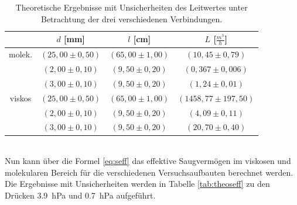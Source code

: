\documentclass[a4paper,usenatbib]{aspdoc}
\begin{document}
            \begin{table}
                \begin{tabular}{c|c|c|c}
                    \multicolumn{1}{c}{} & \multicolumn{1}{c}{$d$ [mm]} & \multicolumn{1}{c}{$l$ [cm]} & \multicolumn{1}{c}{$L$ [$\frac{m^3}{h}$]}\\
                    \cmidrule(lr){2-2}\cmidrule(lr){3-3}\cmidrule(lr){4-4}
                    \toprule
                     molek.  & $(25,00 \pm 0,50)$    & $(65,00 \pm 1,00)$   & $(10,45 \pm 0,79)$ \\
                                & $(2,00 \pm 0,10)$     & $(9,50 \pm 0,20)$     & $(0,367 \pm 0,006)$\\
                                & $(3,00 \pm 0,10)$     & $(9,50 \pm 0,20)$     & $(1,24 \pm 0,01)$\\
                    \cline{1-4}
                     viskos     & $(25,00 \pm 0,50)$    & $(65,00 \pm 1,00)$   & $(1458,77 \pm 197,50)$\\ %
                                & $(2,00 \pm 0,10)$     & $(9,50 \pm 0,20)$     & $(4,09 \pm 0,11)$\\
                                & $(3,00 \pm 0,10)$     & $(9,50 \pm 0,20)$     & $(20,70 \pm 0,40)$\\
                    \bottomrule
                \end{tabular}
                \caption{Theoretische Ergebnisse mit Unsicherheiten des Leitwertes unter Betrachtung der drei verschiedenen Verbindungen.}
                \label{tab:theoleit}
            \end{table}
            \\
            Nun kann über die Formel \ref{eq:seff} das effektive Saugvermögen im viskosen und molekularen Bereich für die verschiedenen Versuchsaufbauten berechnet werden. Die Ergebnisse mit Unsicherheiten werden in Tabelle \ref{tab:theoseff} zu den Drücken \SI{3,9}{\hecto\pascal} und \SI{0,7}{\hecto\pascal} aufgeführt.\\
            
\end{document}
